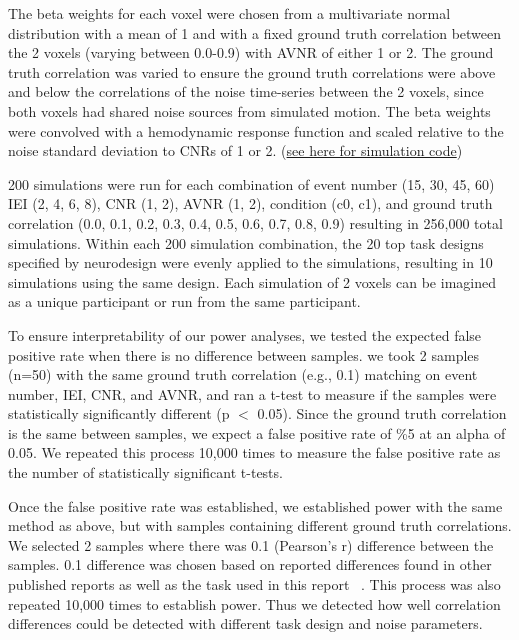 \documentclass[10pt,letterpaper]{article}
\begin{document}
The beta weights for each voxel were chosen from a multivariate normal distribution
with a mean of 1 and with a fixed ground truth correlation between the 2 voxels 
(varying between 0.0-0.9) with AVNR of either 1 or 2.
The ground truth correlation was varied to ensure the ground truth correlations were above
and below the correlations of the noise time-series between the 2 voxels,
since both voxels had shared noise sources from simulated motion.
The beta weights were convolved with a hemodynamic response function and scaled
relative to the noise standard deviation to CNRs of 1 or 2.
(\href{https://github.com/jdkent/betaSeriesSimulations/tree/38dfbf2d83a8ab742d134c490b850ad893c8b4c7/beta_sim}{see here for simulation code})

200 simulations were run for each combination of event number
(15, 30, 45, 60) IEI (2, 4, 6, 8),  CNR (1, 2), AVNR (1, 2), condition (c0, c1),
and ground truth correlation
(0.0, 0.1, 0.2, 0.3, 0.4, 0.5, 0.6, 0.7, 0.8, 0.9)
resulting in 256,000 total simulations.
Within each 200 simulation combination, the 20 top task designs specified by
neurodesign were evenly applied to the simulations, resulting in 10 simulations
using the same design.
Each simulation of 2 voxels can be imagined as a unique participant or run from
the same participant.

To ensure interpretability of our power analyses, we tested
the expected false positive rate when there is no difference between samples.
we took 2 samples (n=50) with the same ground truth correlation (e.g., 0.1)
matching on event number, IEI, CNR, and AVNR, and ran a t-test to measure if the samples
were statistically significantly different (p $<$ 0.05).
Since the ground truth correlation is the same between samples,
we expect a false positive rate of \%5 at an alpha of 0.05.
We repeated this process 10,000 times to measure the false positive rate as
the number of statistically significant t-tests.

Once the false positive rate was established, we established power with the same method as above,
but with samples containing different ground truth correlations.
We selected 2 samples where there was 0.1 (Pearson's r) difference between the samples.
0.1 difference was chosen based on reported differences found in other published
reports as well as the task used in this report ~\cite{Katsura2014,Lee2017,Turner2017,Lin2019,Huang2019}.
This process was also repeated 10,000 times to establish power.
Thus we detected how well correlation differences could be detected
with different task design and noise parameters.
\end{document}
